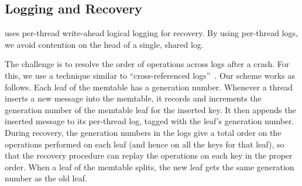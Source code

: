 \subsection{Logging and Recovery}
\label{sec:recovery}

\sysname uses per-thread write-ahead logical logging for recovery.  By
using per-thread logs, we avoid contention on the head of a single,
shared log.

The challenge is to resolve the order of operations across logs after
a crash.  For this, we use a technique similar to ``cross-referenced
logs''~\cite{DBLP:conf/usenix/HuangPMS0B18}.  Our scheme works as
follows.  Each leaf of the memtable has a generation number.  Whenever
a thread inserts a new message into the memtable, it records and
increments the generation number of the memtable leaf for the inserted
key.  It then appends the inserted message to its per-thread log,
tagged with the leaf's generation number.  During recovery, the
generation numbers in the logs give a total order on the operations
performed on each leaf (and hence on all the keys for that leaf), so
that the recovery procedure can replay the operations on each key in
the proper order.  When a leaf of the memtable splits, the new leaf
gets the same generation number as the old leaf.



